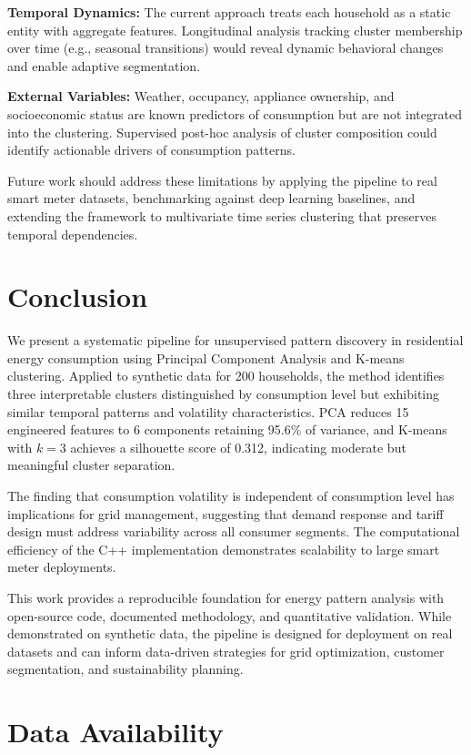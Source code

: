 \documentclass[11pt]{article}
\begin{document}
\textbf{Temporal Dynamics:} The current approach treats each household as a static entity with aggregate features. Longitudinal analysis tracking cluster membership over time (e.g., seasonal transitions) would reveal dynamic behavioral changes and enable adaptive segmentation.

\textbf{External Variables:} Weather, occupancy, appliance ownership, and socioeconomic status are known predictors of consumption but are not integrated into the clustering. Supervised post-hoc analysis of cluster composition could identify actionable drivers of consumption patterns.

Future work should address these limitations by applying the pipeline to real smart meter datasets, benchmarking against deep learning baselines, and extending the framework to multivariate time series clustering that preserves temporal dependencies.

\section{Conclusion}

We present a systematic pipeline for unsupervised pattern discovery in residential energy consumption using Principal Component Analysis and K-means clustering. Applied to synthetic data for 200 households, the method identifies three interpretable clusters distinguished by consumption level but exhibiting similar temporal patterns and volatility characteristics. PCA reduces 15 engineered features to 6 components retaining 95.6\% of variance, and K-means with $k=3$ achieves a silhouette score of 0.312, indicating moderate but meaningful cluster separation.

The finding that consumption volatility is independent of consumption level has implications for grid management, suggesting that demand response and tariff design must address variability across all consumer segments. The computational efficiency of the C++ implementation demonstrates scalability to large smart meter deployments.

This work provides a reproducible foundation for energy pattern analysis with open-source code, documented methodology, and quantitative validation. While demonstrated on synthetic data, the pipeline is designed for deployment on real datasets and can inform data-driven strategies for grid optimization, customer segmentation, and sustainability planning.

\section*{Data Availability}
\end{document}
